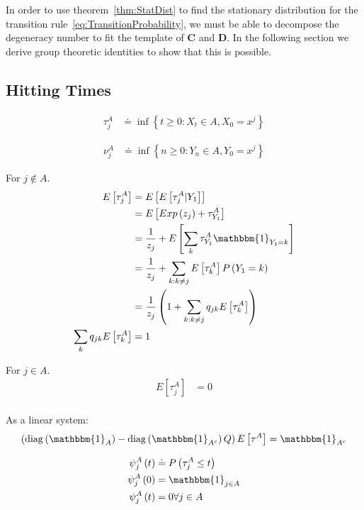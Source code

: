 In order to use theorem~\ref{thm:StatDist} to find the stationary distribution for the transition rule~\ref{eq:TransitionProbability}, we must be able to decompose the degeneracy number \Sjk\spc to fit the template of $\mathbf{C}$ and $\mathbf{D}$. In the following section we derive group theoretic identities to show that this is possible.

\subsection{Hitting Times}

\begin{align}
	\tau^{A}_{j} &\doteq \inf\left\{t \geq 0 : X_t \in A, X_0 = x^j\right\}
\end{align}

\begin{align}
	\nu^{A}_{j} &\doteq \inf\left\{n \geq 0 : Y_n \in A, Y_0 = x^j\right\}
\end{align}

For $j \not\in A$.
\begin{align}
	E\left[\tau^{A}_{j}\right] &= E\left[E\left[\tau^{A}_{j} | Y_1 \right]\right] \\
        &= E\left[ Exp\left(z_j\right) + \tau^{A}_{Y_1} \right] \\
        &=  \frac{1}{z_j} + E\left[\sum_{k}\tau^{A}_{Y_1}\mathbbm{1}_{Y_1 = k}\right] \\
        &=  \frac{1}{z_j} + \sum_{k: k\neq j}E\left[\tau^{A}_{k}\right] P\left(Y_1 = k\right) \\
        &=  \frac{1}{z_j}\left(1 + \sum_{k: k\neq j}q_{jk}E\left[\tau^{A}_{k}\right]\right)     \\
  \sum_{k}q_{jk}E\left[\tau^{A}_{k}\right] &= 1 \\
\end{align}

For $j \in A$.
\begin{align}
	E\left[\tau^{A}_{j}\right] &= 0 \\
\end{align}

As a linear system:
\begin{align}
	\left(\diag\left(\mathbbm{1}_A\right) - \diag\left(\mathbbm{1}_{A^c}\right)Q\right)E\left[\tau^{A}\right] =\mathbbm{1}_{A^c}\\
\end{align}


\begin{align}
\psi_j^A\left(t\right) &\doteq P\left(\tau^A_j \leq t\right) \\
\psi_j^A\left(0\right) &= \mathbbm{1}_{j\in A} \\
\psi_j^A\left(t\right) &= 0 \forall j \in A \\                       
\end{align}

